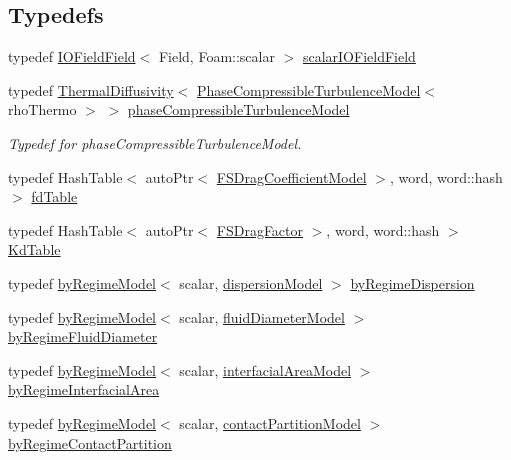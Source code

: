 \subsection*{Typedefs}
\begin{DoxyCompactItemize}
\item 
typedef \hyperlink{classFoam_1_1IOFieldField}{I\+O\+Field\+Field}$<$ Field, Foam\+::scalar $>$ \hyperlink{namespaceFoam_adbfd1f3f51dc7617aa2c901685a43266}{scalar\+I\+O\+Field\+Field}
\item 
typedef \hyperlink{classFoam_1_1ThermalDiffusivity}{Thermal\+Diffusivity}$<$ \hyperlink{classFoam_1_1PhaseCompressibleTurbulenceModel}{Phase\+Compressible\+Turbulence\+Model}$<$ rho\+Thermo $>$ $>$ \hyperlink{namespaceFoam_a21fdbb0b53653a278781d894a16c8a88}{phase\+Compressible\+Turbulence\+Model}
\begin{DoxyCompactList}\small\item\em Typedef for phase\+Compressible\+Turbulence\+Model. \end{DoxyCompactList}\item 
typedef Hash\+Table$<$ auto\+Ptr$<$ \hyperlink{classFoam_1_1FSDragCoefficientModel}{F\+S\+Drag\+Coefficient\+Model} $>$, word, word\+::hash $>$ \hyperlink{namespaceFoam_a7760b746b5c75541218a8e6bcf18af90}{fd\+Table}
\item 
typedef Hash\+Table$<$ auto\+Ptr$<$ \hyperlink{classFoam_1_1FSDragFactor}{F\+S\+Drag\+Factor} $>$, word, word\+::hash $>$ \hyperlink{namespaceFoam_a9fff7443e03586fe1171f2b48bf43ac0}{Kd\+Table}
\item 
typedef \hyperlink{classFoam_1_1byRegimeModel}{by\+Regime\+Model}$<$ scalar, \hyperlink{classFoam_1_1dispersionModel}{dispersion\+Model} $>$ \hyperlink{namespaceFoam_aca2583acdeaa11914afd02b147b665e0}{by\+Regime\+Dispersion}
\item 
typedef \hyperlink{classFoam_1_1byRegimeModel}{by\+Regime\+Model}$<$ scalar, \hyperlink{classFoam_1_1fluidDiameterModel}{fluid\+Diameter\+Model} $>$ \hyperlink{namespaceFoam_a37b69c3166b91333f06a5a6e7edcbcfe}{by\+Regime\+Fluid\+Diameter}
\item 
typedef \hyperlink{classFoam_1_1byRegimeModel}{by\+Regime\+Model}$<$ scalar, \hyperlink{classFoam_1_1interfacialAreaModel}{interfacial\+Area\+Model} $>$ \hyperlink{namespaceFoam_afdf68c0599c54515d78f0565678d1545}{by\+Regime\+Interfacial\+Area}
\item 
typedef \hyperlink{classFoam_1_1byRegimeModel}{by\+Regime\+Model}$<$ scalar, \hyperlink{classFoam_1_1contactPartitionModel}{contact\+Partition\+Model} $>$ \hyperlink{namespaceFoam_a41017611e326f39a1a0e4469a6091014}{by\+Regime\+Contact\+Partition}

\end{DoxyCompactItemize}
